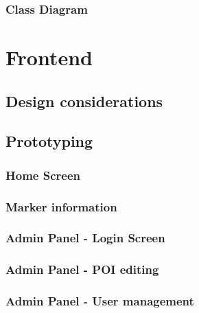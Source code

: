 \subsubsection{Class Diagram}


\section{Frontend}

\subsection{Design considerations}

\subsection{Prototyping}

\subsubsection{Home Screen}


\subsubsection{Marker information}

\subsubsection{Admin Panel - Login Screen}
\subsubsection{Admin Panel - POI editing}

\subsubsection{Admin Panel - User management}
